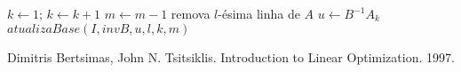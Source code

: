 \documentclass[12pt]{article}
\begin{document}
\begin{algorithmic}
		\State $k \gets 1$;
			\State $k \gets k + 1$
		\EndWhile
			\State $m \gets m - 1$
			\State remova $l$-ésima linha de $A$
		\Else
			\State $u \gets B^{-1}A_k$ 
			\State $atualizaBase(I, invB, u, l, k, m)$
		\EndIf 
	\EndFor
\EndFunction
\end{algorithmic}
	

	

\newpage
\begin{thebibliography}{9}
 Dimitris Bertsimas, John N. Tsitsiklis. Introduction to Linear Optimization. 1997.
\end{thebibliography}
\end{document}
